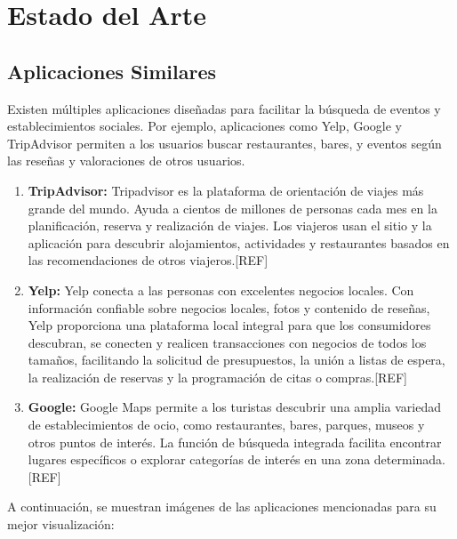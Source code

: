 \chapter{Estado del Arte}
\section{Aplicaciones Similares}

Existen múltiples aplicaciones diseñadas para facilitar la búsqueda de eventos y establecimientos sociales. Por
ejemplo, aplicaciones como Yelp, Google y TripAdvisor permiten a los usuarios buscar restaurantes, bares, y eventos
según las reseñas y valoraciones de otros usuarios.

\begin{enumerate}
    \item \textbf{TripAdvisor:} Tripadvisor es la plataforma de orientación de viajes más grande del mundo. Ayuda a
          cientos de millones de personas cada mes en la planificación, reserva y realización de viajes. Los viajeros usan
          el sitio y la aplicación para descubrir alojamientos, actividades y restaurantes basados en las recomendaciones
          de otros viajeros.[REF]

    \item \textbf{Yelp:} Yelp conecta a las personas con excelentes negocios locales. Con información confiable
          sobre negocios locales, fotos y contenido de reseñas, Yelp proporciona una plataforma local integral para que
          los consumidores descubran, se conecten y realicen transacciones con negocios de todos los tamaños, facilitando
          la solicitud de presupuestos, la unión a listas de espera, la realización de reservas y la programación de citas
          o compras.[REF]

    \item \textbf{Google:} Google Maps permite a los turistas descubrir una amplia variedad de establecimientos de
          ocio, como restaurantes, bares, parques, museos y otros puntos de interés. La función de búsqueda integrada
          facilita encontrar lugares específicos o explorar categorías de interés en una zona determinada.[REF]

\end{enumerate}

A continuación, se muestran imágenes de las aplicaciones mencionadas para su mejor visualización:

